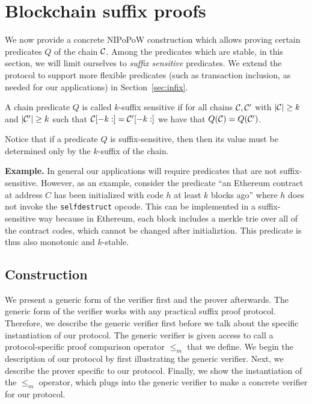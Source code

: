 \section{Blockchain suffix proofs}
We now provide a concrete NIPoPoW construction which allows proving certain
predicates $Q$ of the chain $\mathcal{C}$.
Among the predicates which are stable, in this section, we will limit ourselves to \textit{suffix sensitive} predicates.
We extend the protocol to support more flexible predicates (such as transaction inclusion, as needed for our applications) in Section~\ref{sec:infix}.

\begin{definition}
A chain predicate $Q$ is called $k$-\textnormal{suffix sensitive} if for all
chains $\mathcal{C}, \mathcal{C}'$ with $|\mathcal{C}| \geq k$ and $|\mathcal{C}'| \geq k$ such that
$\mathcal{C}[-k:] = \mathcal{C}'[-k:]$ we have that $Q(\mathcal{C}) = Q(\mathcal{C}')$.
\end{definition}

Notice that if a predicate $Q$ is suffix-sensitive, then then its value must be determined only by the $k$-suffix of the chain.

\textbf{Example.}
In general our applications will require predicates that are not suffix-sensitive. However, as an example, consider the predicate ``an Ethereum contract at address $C$ has been initialized with code $h$ at least $k$ blocks ago'' where $h$ does not invoke the \texttt{selfdestruct} opcode. This can be implemented in a suffix-sensitive way because in Ethereum, each block includes a merkle trie over all of the contract codes, which cannot be changed after initializtion. This predicate is thus also monotonic and $k$-stable.

\subsection{Construction}
We present a generic form of the verifier first and the prover afterwards. The
generic form of the verifier works with any practical suffix proof protocol.
Therefore, we describe the generic verifier first before we talk about the
specific instantiation of our protocol. The generic verifier is given access to
call a protocol-specific proof comparison operator $\leq_m$ that we define. We begin the
description of our protocol by first illustrating the generic verifier. Next, we
describe the prover specific to our protocol. Finally, we show the instantiation
of the $\leq_m$ operator, which plugs into the generic verifier to make a
concrete verifier for our protocol.

